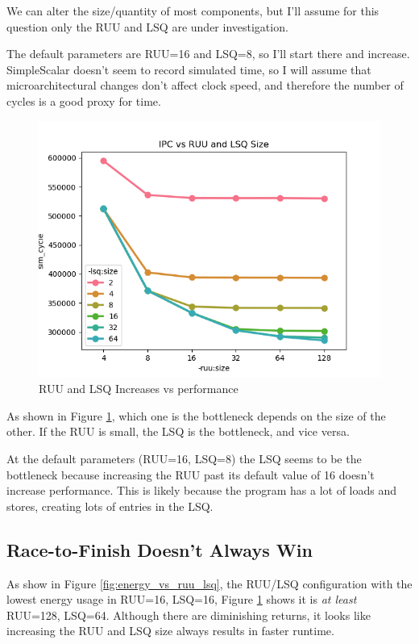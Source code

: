 \documentclass{article}
\begin{document}
\begin{multicols}{2}
  We can alter the size/quantity of most components, but I'll assume for this question only the RUU and LSQ are under investigation.

  The default parameters are RUU=16 and LSQ=8, so I'll start there and increase. SimpleScalar doesn't seem to record simulated time, so I will assume that microarchitectural changes don't affect clock speed, and therefore the number of cycles is a good proxy for time.

  \begin{figure}[H]
    \centering
    \includegraphics[width=\linewidth]{./assets/ruu_and_lsq_vs_sim_time.png}
    \caption{RUU and LSQ Increases vs performance}
    \label{fig:ruu_or_lsq_bottleneck}
  \end{figure}

  As shown in Figure \ref{fig:ruu_or_lsq_bottleneck}, which one is the bottleneck depends on the size of the other. If the RUU is small, the LSQ is the bottleneck, and vice versa.

  At the default parameters (RUU=16, LSQ=8) the LSQ seems to be the bottleneck because increasing the RUU past its default value of 16 doesn't increase performance. This is likely because the program has a lot of loads and stores, creating lots of entries in the LSQ.

  \subsection{Race-to-Finish Doesn't Always Win}
  As show in Figure \ref{fig:energy_vs_ruu_lsq}, the RUU/LSQ configuration with the lowest energy usage in RUU=16, LSQ=16, Figure \ref{fig:ruu_or_lsq_bottleneck} shows it is \textit{at least} RUU=128, LSQ=64. Although there are diminishing returns, it looks like increasing the RUU and LSQ size always results in faster runtime.


\end{multicols}
\end{document}
